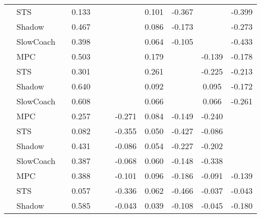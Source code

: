\begin{tabular}{|l|l|*{9}{c|}}
                                                           & STS &       &     0.133 &        &     &     &  0.101 &  -0.367 &      &   -0.399 \\
                                                           & Shadow &       &     0.467 &        &     &     &  0.086 &  -0.173 &      &   -0.273 \\
                                                           & SlowCoach &       &     0.398 &        &     &     &  0.064 &  -0.105 &      &   -0.433 \\
\midrule
[False, True, False, False, False, True, False, True, True] & MPC &       &     0.503 &        &     &     &  0.179 &      &  -0.139 &   -0.178 \\
                                                           & STS &       &     0.301 &        &     &     &  0.261 &      &  -0.225 &   -0.213 \\
                                                           & Shadow &       &     0.640 &        &     &     &  0.092 &      &   0.095 &   -0.172 \\
                                                           & SlowCoach &       &     0.608 &        &     &     &  0.066 &      &   0.066 &   -0.261 \\
\midrule
[False, True, False, False, True, True, True, True, False] & MPC &       &     0.257 &        &     & -0.271 &  0.084 &  -0.149 &  -0.240 &       \\
                                                           & STS &       &     0.082 &        &     & -0.355 &  0.050 &  -0.427 &  -0.086 &       \\
                                                           & Shadow &       &     0.431 &        &     & -0.086 &  0.054 &  -0.227 &  -0.202 &       \\
                                                           & SlowCoach &       &     0.387 &        &     & -0.068 &  0.060 &  -0.148 &  -0.338 &       \\
\midrule
[False, True, False, False, True, True, True, True, True] & MPC &       &     0.388 &        &     & -0.101 &  0.096 &  -0.186 &  -0.091 &   -0.139 \\
                                                           & STS &       &     0.057 &        &     & -0.336 &  0.062 &  -0.466 &  -0.037 &   -0.043 \\
                                                           & Shadow &       &     0.585 &        &     & -0.043 &  0.039 &  -0.108 &  -0.045 &   -0.180 \\

\end{tabular}
